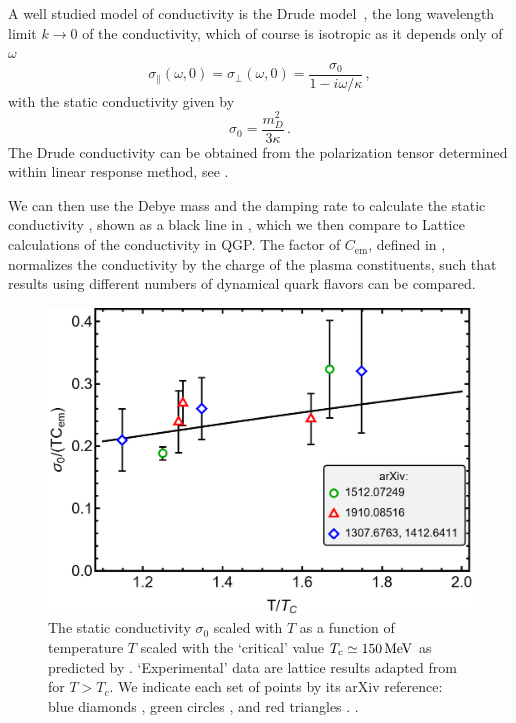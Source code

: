 A  well studied model of conductivity is the Drude model~\cite{Drude:1900}, the long wavelength limit $k \to 0$ of the conductivity, which of course is isotropic as it depends only of $\omega$
\begin{equation}\label{eq:drude}
    \sigma_\parallel(\omega,0) = \sigma_\perp(\omega,0) = \frac{\sigma_0}{1-i \omega/\kappa} \,,
\end{equation}
with the static conductivity given by
\begin{equation}\label{eq:condstat}
   \sigma_0 = \frac{m_D^2}{3\kappa}\,.
\end{equation} 
The Drude conductivity can be obtained from the polarization tensor  determined within linear response method, see .

We can then use the Debye mass  and the damping rate  to calculate the static conductivity , shown as a black line in , which we then compare to Lattice calculations of the conductivity in QGP.  The factor of $C_{\text{em}}$, defined in , normalizes the conductivity by the charge of the plasma constituents, such that results using different numbers of dynamical quark flavors can be compared.

\begin{figure}
    \centering
    \includegraphics[width=0.75\linewidth]{plots/condcomp.png}
    \caption{The static conductivity $\sigma_0$ scaled with $T$ as a function of temperature $T$ scaled with the `critical' value $T_c\simeq 150\text{\,MeV}$ as predicted by . `Experimental' data are lattice results adapted from \cite{Aarts:2020dda} for $T>T_c$.  We indicate each set of points by its arXiv reference: blue diamonds \cite{Amato:2013naa,Aarts:2014nba}, green circles \cite{Brandt:2015aqk}, and red triangles \cite{Astrakhantsev:2019zkr}. .}
    \label{fig:lattice comp}
\end{figure}

